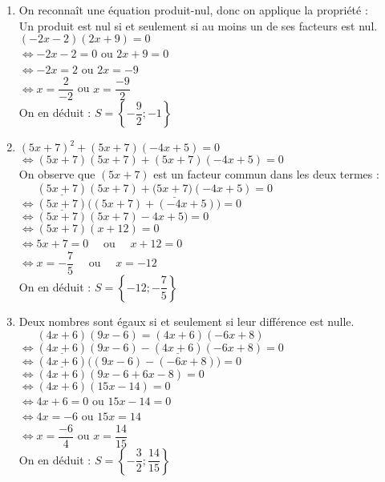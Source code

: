 \documentclass[a4paper,11pt,exos]{nsi} %
\begin{document}
\begin{enumerate}
    \item On reconnaît une équation produit-nul, donc on applique la propriété :\\
                    {\color[HTML]{f15929}Un produit est nul si et seulement si au moins un de ses facteurs est nul.}\\$(-2x-2)(2x+9)=0$\\$\iff -2x-2=0$ ou $2x+9=0$\\$\iff -2x=2$ ou $ 2x=-9$\\$\iff x=\dfrac{2}{-2}$ ou $ x=\dfrac{-9}{2}$\\On en déduit :  $S=\left\{-\dfrac{9}{2};-1\right\}$
    \item  $(5x+7)^{2}+(5x+7)(-4x+5)=0$\\ $\iff (5x+7)(5x+7)+(5x+7)(-4x+5)=0$\\ On observe que $(5x+7)$ est un facteur commun dans les deux termes :\\ $\phantom{\iff} (\underline{5x+7})(5x+7)+(\underline{5x+7)}( -4x+5)=0$\\ $\iff (\underline{5x+7})\Big((5x+7)+(-4x+5)\Big)=0$\\ $\iff (5x+7)( 5x+7)-4x+5)=0$\\ $\iff (5x+7)( x+12)=0$\\$\iff 5x+7=0\quad$ ou $\quad x+12=0$\\$\iff x=-\dfrac{7}{5}\quad$ ou $\quad x=-12$\\
                    On en déduit :  $S=\left\{-12;-\dfrac{7}{5}\right\}$
     
     \item Deux nombres sont égaux si et seulement si leur différence est nulle.\\$\phantom{\iff}(4x+6)(9x-6)=(4x+6)(-6x+8)$\\$\iff (\underline{4x+6})(9x-6)-(\underline{4x+6})(-6x+8)=0$\\$\iff (\underline{4x+6})\Big((9x-6)-(-6x+8)\Big)=0$\\$\iff (4x+6)(9x-6+6x-8)=0$\\$\iff (4x+6)(15x-14)=0$\\$\iff 4x+6=0$ ou $15x-14=0$\\$\iff 4x=-6$ ou $ 15x=14$\\$\iff x=\dfrac{-6}{4}$ ou $ x=\dfrac{14}{15}$\\On en déduit :  $S=\left\{-\dfrac{3}{2};\dfrac{14}{15}\right\}$

\end{enumerate}
\end{document}
